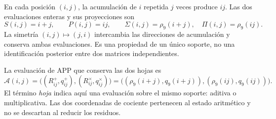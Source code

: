 En cada posición \((i,j)\), la acumulación de \(i\) repetida \(j\) veces produce \(ij\). Las dos evaluaciones enteras y sus proyecciones son
\[
 S(i,j)=i+j,\qquad P(i,j)=ij,\qquad
 \Sigma(i,j)=\rho_9(i+j),\quad \Pi(i,j)=\rho_9(ij).
\]
La simetría \((i,j)\mapsto(j,i)\) intercambia las direcciones de acumulación y conserva ambas evaluaciones. Es una propiedad de un único soporte, no una identificación posterior entre dos matrices independientes.

\begin{definition}
La evaluación de APP que conserva las dos hojas es
\begin{equation}
 \mathcal A(i,j)=
 \bigl((R^+_{ij},q^+_{ij}),(R^\times_{ij},q^\times_{ij})\bigr)
 =\bigl((\rho_9(i+j),q_9(i+j)),(\rho_9(ij),q_9(ij))\bigr).
 \label{x_reciprocidad:eq:app-levantada}
\end{equation}
El término \emph{hoja} indica aquí una evaluación sobre el mismo soporte: aditiva o multiplicativa. Las dos coordenadas de cociente pertenecen al estado aritmético y no se descartan al reducir los residuos.
\end{definition}


